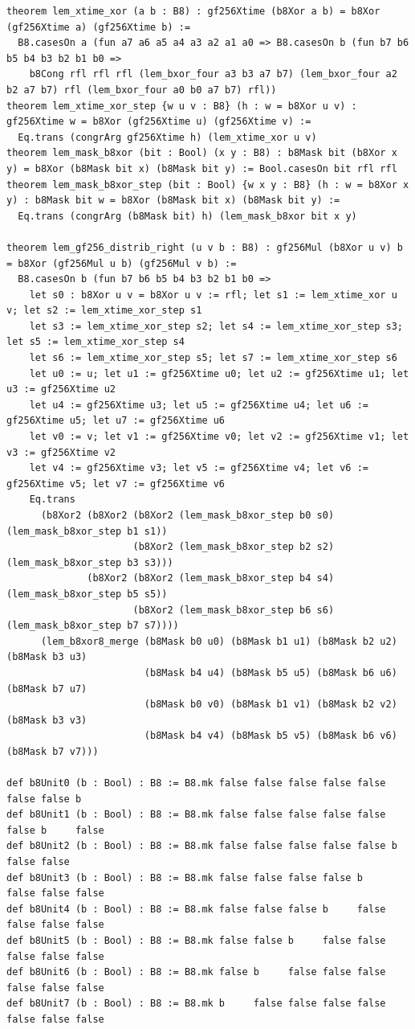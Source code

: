 \documentclass[11pt,letterpaper]{article}
\theoremstyle{spectralthm}
\begin{document}
\begin{lstlisting}[language=Lean4,caption={Standalone Pure Init.Prelude Term-Mode Lean 4 Kernel Suite (thm30--thm61, v0.0.0, 0 sorry, 0 axioms).},label={lst:lean_unified}]
theorem lem_xtime_xor (a b : B8) : gf256Xtime (b8Xor a b) = b8Xor (gf256Xtime a) (gf256Xtime b) :=
  B8.casesOn a (fun a7 a6 a5 a4 a3 a2 a1 a0 => B8.casesOn b (fun b7 b6 b5 b4 b3 b2 b1 b0 =>
    b8Cong rfl rfl rfl (lem_bxor_four a3 b3 a7 b7) (lem_bxor_four a2 b2 a7 b7) rfl (lem_bxor_four a0 b0 a7 b7) rfl))
theorem lem_xtime_xor_step {w u v : B8} (h : w = b8Xor u v) : gf256Xtime w = b8Xor (gf256Xtime u) (gf256Xtime v) :=
  Eq.trans (congrArg gf256Xtime h) (lem_xtime_xor u v)
theorem lem_mask_b8xor (bit : Bool) (x y : B8) : b8Mask bit (b8Xor x y) = b8Xor (b8Mask bit x) (b8Mask bit y) := Bool.casesOn bit rfl rfl
theorem lem_mask_b8xor_step (bit : Bool) {w x y : B8} (h : w = b8Xor x y) : b8Mask bit w = b8Xor (b8Mask bit x) (b8Mask bit y) :=
  Eq.trans (congrArg (b8Mask bit) h) (lem_mask_b8xor bit x y)

theorem lem_gf256_distrib_right (u v b : B8) : gf256Mul (b8Xor u v) b = b8Xor (gf256Mul u b) (gf256Mul v b) :=
  B8.casesOn b (fun b7 b6 b5 b4 b3 b2 b1 b0 =>
    let s0 : b8Xor u v = b8Xor u v := rfl; let s1 := lem_xtime_xor u v; let s2 := lem_xtime_xor_step s1
    let s3 := lem_xtime_xor_step s2; let s4 := lem_xtime_xor_step s3; let s5 := lem_xtime_xor_step s4
    let s6 := lem_xtime_xor_step s5; let s7 := lem_xtime_xor_step s6
    let u0 := u; let u1 := gf256Xtime u0; let u2 := gf256Xtime u1; let u3 := gf256Xtime u2
    let u4 := gf256Xtime u3; let u5 := gf256Xtime u4; let u6 := gf256Xtime u5; let u7 := gf256Xtime u6
    let v0 := v; let v1 := gf256Xtime v0; let v2 := gf256Xtime v1; let v3 := gf256Xtime v2
    let v4 := gf256Xtime v3; let v5 := gf256Xtime v4; let v6 := gf256Xtime v5; let v7 := gf256Xtime v6
    Eq.trans
      (b8Xor2 (b8Xor2 (b8Xor2 (lem_mask_b8xor_step b0 s0) (lem_mask_b8xor_step b1 s1))
                      (b8Xor2 (lem_mask_b8xor_step b2 s2) (lem_mask_b8xor_step b3 s3)))
              (b8Xor2 (b8Xor2 (lem_mask_b8xor_step b4 s4) (lem_mask_b8xor_step b5 s5))
                      (b8Xor2 (lem_mask_b8xor_step b6 s6) (lem_mask_b8xor_step b7 s7))))
      (lem_b8xor8_merge (b8Mask b0 u0) (b8Mask b1 u1) (b8Mask b2 u2) (b8Mask b3 u3)
                        (b8Mask b4 u4) (b8Mask b5 u5) (b8Mask b6 u6) (b8Mask b7 u7)
                        (b8Mask b0 v0) (b8Mask b1 v1) (b8Mask b2 v2) (b8Mask b3 v3)
                        (b8Mask b4 v4) (b8Mask b5 v5) (b8Mask b6 v6) (b8Mask b7 v7)))

def b8Unit0 (b : Bool) : B8 := B8.mk false false false false false false false b
def b8Unit1 (b : Bool) : B8 := B8.mk false false false false false false b     false
def b8Unit2 (b : Bool) : B8 := B8.mk false false false false false b     false false
def b8Unit3 (b : Bool) : B8 := B8.mk false false false false b     false false false
def b8Unit4 (b : Bool) : B8 := B8.mk false false false b     false false false false
def b8Unit5 (b : Bool) : B8 := B8.mk false false b     false false false false false
def b8Unit6 (b : Bool) : B8 := B8.mk false b     false false false false false false
def b8Unit7 (b : Bool) : B8 := B8.mk b     false false false false false false false


\end{lstlisting}
\end{document}
